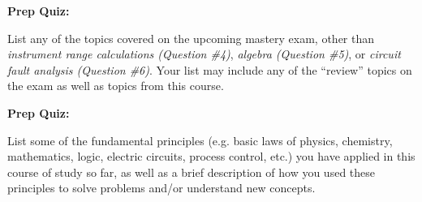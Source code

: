 













\vfil \eject

\noindent
{\bf Prep Quiz:}

List any  of the topics covered on the upcoming mastery exam, other than {\it instrument range calculations (Question \#4)}, {\it algebra (Question \#5)}, or {\it circuit fault analysis (Question \#6)}.  Your list may include any of the ``review'' topics on the exam as well as topics from this course.








\vfil \eject

\noindent
{\bf Prep Quiz:}

List some of the fundamental principles (e.g. basic laws of physics, chemistry, mathematics, logic, electric circuits, process control, etc.) you have applied in this course of study so far, as well as a brief description of how you used these principles to solve problems and/or understand new concepts.





